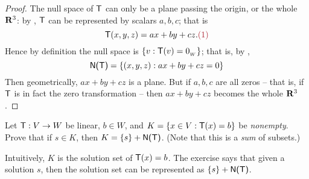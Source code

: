 \begin{proof}
The null space of \(\textsf{T}\) can only be a plane passing the origin, or the whole \(\mathbf{R}^3\): by , \(\textsf{T}\) can be represented by scalars \(a, b, c\);
that is
\[
    \T(x, y, z) = ax + by + cz. \MAROON{(1)}
\]
Hence by definition the null space is \(\{ v : \textsf{T}(v) = 0_{_W} \}\);
that is, by ,
\[
    \textsf{N(T)} = \{(x, y, z): ax + by + cz = 0\}
\]
Then geometrically, \(ax + by + cz\) is a plane.
But if \(a, b, c\) are all zeros -- that is, if \(\textsf{T}\) is in fact the zero transformation -- then \(ax + by + cz\) becomes the whole \(\mathbf{R}^3\).
\end{proof}

\begin{exercise} \label{exercise 2.1.24}
Let \(\textsf{T} : V \to W\) be linear, \(b \in W\), and \(K = \{ x \in V : \textsf{T}(x) = b \}\) be \emph{nonempty}.
Prove that if \(s \in K\), then \(K = \{ s \} + \textsf{N(T)}\). (Note that this is a \emph{sum} of subsets.)
\end{exercise}

\begin{note}
Intuitively, \(K\) is the solution set of \(\textsf{T}(x) = b\).
The exercise says that given a solution \(s\), then the solution set can be represented as \(\{ s \} + \textsf{N(T)}\).
\end{note}

